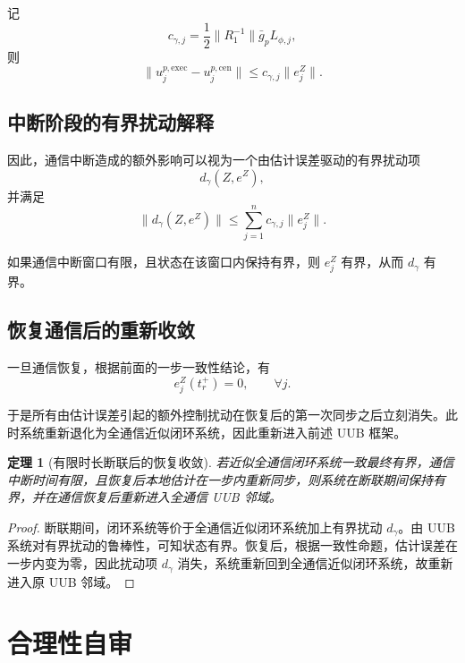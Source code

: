 \documentclass[12pt,a4paper]{ctexart}
\newtheorem{theorem}{定理}
\begin{document}
记
\begin{equation}
c_{\gamma,j}=\frac{1}{2}\|R_1^{-1}\|\bar g_p L_{\phi,j},
\end{equation}
则
\begin{equation}
\|u_j^{p,\mathrm{exec}}-u_j^{p,\mathrm{cen}}\|
\le
c_{\gamma,j}\|e_j^Z\|.
\end{equation}

\subsection{中断阶段的有界扰动解释}

因此，通信中断造成的额外影响可以视为一个由估计误差驱动的有界扰动项
\begin{equation}
d_{\gamma}(Z,e^Z),
\end{equation}
并满足
\begin{equation}
\|d_{\gamma}(Z,e^Z)\|
\le
\sum_{j=1}^{n} c_{\gamma,j}\|e_j^Z\|.
\end{equation}

如果通信中断窗口有限，且状态在该窗口内保持有界，则 $e_j^Z$ 有界，从而 $d_{\gamma}$ 有界。

\subsection{恢复通信后的重新收敛}

一旦通信恢复，根据前面的一步一致性结论，有
\begin{equation}
e_j^Z(t_r^+)=0,\qquad \forall j.
\end{equation}

于是所有由估计误差引起的额外控制扰动在恢复后的第一次同步之后立刻消失。此时系统重新退化为全通信近似闭环系统，因此重新进入前述 UUB 框架。

\begin{theorem}[有限时长断联后的恢复收敛]
若近似全通信闭环系统一致最终有界，通信中断时间有限，且恢复后本地估计在一步内重新同步，则系统在断联期间保持有界，并在通信恢复后重新进入全通信 UUB 邻域。
\end{theorem}

\begin{proof}
断联期间，闭环系统等价于全通信近似闭环系统加上有界扰动 $d_{\gamma}$。由 UUB 系统对有界扰动的鲁棒性，可知状态有界。恢复后，根据一致性命题，估计误差在一步内变为零，因此扰动项 $d_{\gamma}$ 消失，系统重新回到全通信近似闭环系统，故重新进入原 UUB 邻域。
\end{proof}

\section{合理性自审}
\end{document}
